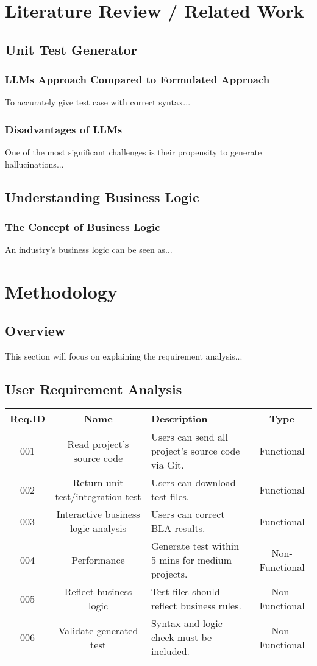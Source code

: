 \documentclass[12pt,a4paper]{report}
\begin{document}
\chapter{Literature Review / Related Work}
\section{Unit Test Generator}
\subsection{LLMs Approach Compared to Formulated Approach}
To accurately give test case with correct syntax...

\subsection{Disadvantages of LLMs}
One of the most significant challenges is their propensity to generate hallucinations...

\section{Understanding Business Logic}
\subsection{The Concept of Business Logic}
An industry’s business logic can be seen as...

\chapter{Methodology}
\section{Overview}
This section will focus on explaining the requirement analysis...

\section{User Requirement Analysis}
\begin{longtable}{|c|c|p{8cm}|c|}
\hline
\textbf{Req.ID} & \textbf{Name} & \textbf{Description} & \textbf{Type} \\
\hline
001 & Read project’s source code & Users can send all project’s source code via Git. & Functional \\
002 & Return unit test/integration test & Users can download test files. & Functional \\
003 & Interactive business logic analysis & Users can correct BLA results. & Functional \\
004 & Performance & Generate test within 5 mins for medium projects. & Non-Functional \\
005 & Reflect business logic & Test files should reflect business rules. & Non-Functional \\
006 & Validate generated test & Syntax and logic check must be included. & Non-Functional \\
\hline
\end{longtable}
\end{document}
